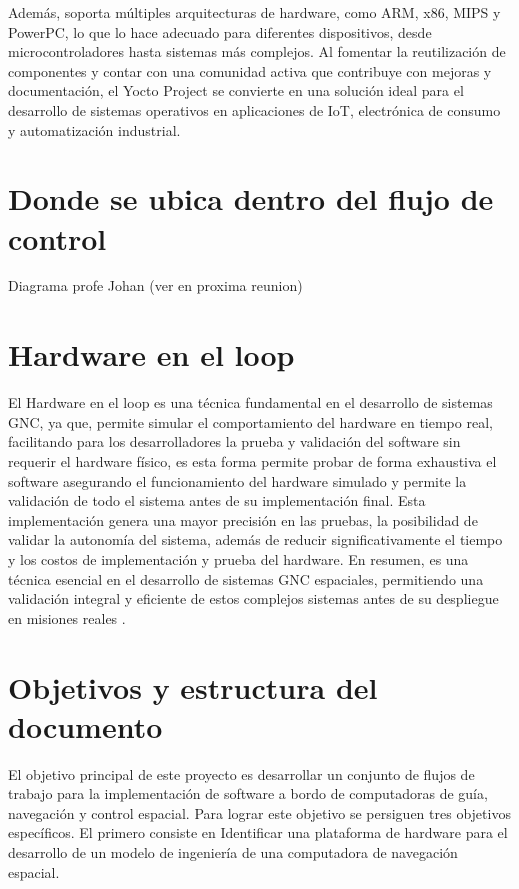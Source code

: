 Además, soporta múltiples arquitecturas de hardware, como ARM, x86, MIPS y PowerPC, lo que lo hace adecuado para diferentes dispositivos, desde microcontroladores hasta sistemas más complejos. Al fomentar la reutilización de componentes y contar con una comunidad activa que contribuye con mejoras y documentación, el Yocto Project se convierte en una solución ideal para el desarrollo de sistemas operativos en aplicaciones de IoT, electrónica de consumo y automatización industrial. \cite{vaduva2015learning}

\section{Donde se ubica dentro del flujo de control}
Diagrama profe Johan (ver en proxima reunion)

\section{Hardware en el loop}
El Hardware en el loop es una técnica fundamental en el desarrollo de sistemas GNC, ya que, permite 
simular el comportamiento del hardware en tiempo real, facilitando para los desarrolladores la 
prueba y validación del software sin requerir el hardware físico, es esta forma permite probar 
de forma exhaustiva el software asegurando el funcionamiento del hardware simulado y permite la 
validación de todo el sistema antes de su implementación final. Esta implementación genera una 
mayor precisión en las pruebas, la posibilidad de validar la autonomía del sistema, además de 
reducir significativamente el tiempo y los costos de implementación y prueba del hardware. En 
resumen, es una técnica esencial en el desarrollo de sistemas GNC espaciales, permitiendo una 
validación integral y eficiente de estos complejos sistemas antes de su despliegue en misiones 
reales \cite{mihalivc2022hardware} \cite{montoya2020advanced}.




\section{Objetivos y estructura del documento}

El objetivo principal de este proyecto es desarrollar un conjunto de flujos de trabajo para la implementación de software a bordo de computadoras de guía, navegación y control espacial. Para lograr este objetivo se persiguen tres objetivos específicos. El primero consiste en Identificar una plataforma de hardware para el desarrollo de un modelo de ingeniería de una computadora de navegación espacial.

